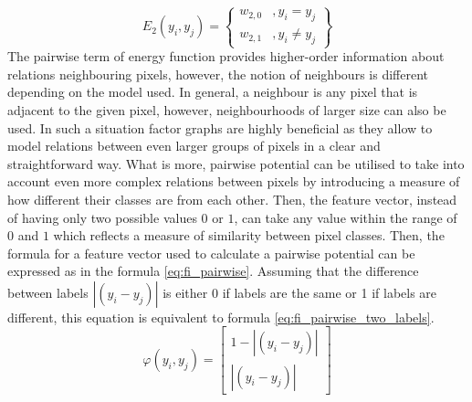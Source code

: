 \begin{equation}
 \label{eq:energy_pairwise}
    E_2(y_i,y_j)=\begin{Bmatrix}
     w_{2,0} & , y_i=y_j \\ 
     w_{2,1} & , y_i \neq y_j
    \end{Bmatrix}
\end{equation}
The pairwise term of energy function provides higher-order information about relations neighbouring pixels, however, the notion of neighbours is different depending on the model used. In general, a neighbour is any pixel that is adjacent to the given pixel, however, neighbourhoods of larger size can also be used. In such a situation factor graphs are highly beneficial as they allow to model relations between even larger groups of pixels in a clear and straightforward way. What is more, pairwise potential can be utilised to take into account even more complex relations between pixels by introducing a measure of how different their classes are from each other. Then, the feature vector, instead of having only two possible values $0$ or $1$, can take any value within the range of $0$ and $1$ which reflects a measure of similarity between pixel classes. Then, the formula for a feature vector used to calculate a pairwise potential can be expressed as in the formula \ref{eq:fi_pairwise}. Assuming that the difference between labels $\left | (y_i - y_j) \right |$ is either 0 if labels are the same or 1 if labels are different, this equation is equivalent to formula \ref{eq:fi_pairwise_two_labels}.
\begin{equation}
    \label{eq:fi_pairwise}
    \varphi(y_i,y_j) = \begin{bmatrix}
        1 - \left | (y_i - y_j) \right | \\
        \left | (y_i - y_j) \right |
    \end{bmatrix}
\end{equation}

